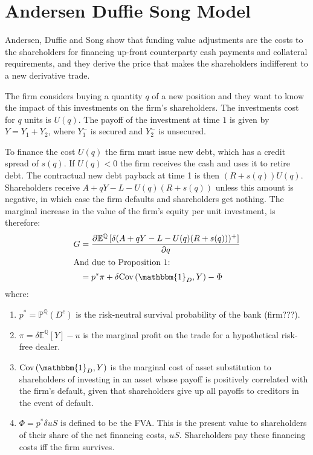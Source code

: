 \documentclass[10pt,a4paper]{article}
\begin{document}
    \section{Andersen Duffie Song Model}

        Andersen, Duffie and Song show that funding value adjustments are the costs to the shareholders for financing up-front counterparty cash payments and collateral requirements, and they derive the price that makes the shareholders indifferent to a new derivative trade.
        
        The firm considers buying a quantity $q$ of a new position and they want to know the impact of this investments on the firm's shareholders. The investments cost for $q$ units is $U(q)$. The payoff of the investment at time $1$ is given by $Y=Y_{1} + Y_{2}$, where $Y_{1}^{-}$ is secured and $Y_{2}^{-}$ is unsecured.

        To finance the cost $U(q)$ the firm must issue new debt, which has a credit spread of $s(q)$. If $U(q) <0$ the firm receives the cash and uses it to retire debt. The contractual new debt payback at time 1 is then $(R+s(q))U(q)$. Shareholders receive $A + qY - L - U(q)(R+s(q))$ unless this amount is negative, in which case the firm defaults and shareholders get nothing. The marginal increase in the value of the firm's equity per unit investment, is therefore:
            \begin{align}
                G &= \frac{\partial \mathbb{E}^{\mathbb{Q}}\left[\delta(A + qY - L - U(q)(R+s(q)))^{+}\right] }{\partial q} \\
                \intertext{And due to Proposition 1:}
                &= p^{\ast}\pi + \delta \text{Cov}\left(\mathbbm{1}_{D}, Y\right)  - \Phi
            \end{align}
        where:
            \begin{enumerate}
                \item $p^{\ast}=\mathbb{P}^{\mathbb{Q}}\left(D^{c}\right) $ is the risk-neutral survival probability of the bank (firm???).
                \item $\pi = \delta \mathbb{E}^{\mathbb{Q}}\left[Y\right] - u $ is the marginal profit on the trade for a hypothetical risk-free dealer.
                \item $\text{Cov}\left(\mathbbm{1}_{D}, Y\right)$ is the marginal cost of asset substitution to shareholders of investing in an asset whose payoff is positively correlated with the firm's default, given that shareholders give up all payoffs to creditors in the event of default. 
                \item $\Phi = p^{\ast}\delta u S$ is defined to be the FVA. This is the present value to shareholders of their share of the net financing costs, $uS$. Shareholders pay these financing costs iff the firm survives.
            \end{enumerate}
\end{document}
